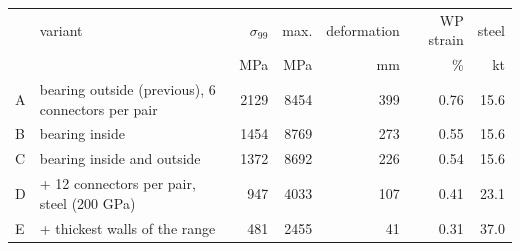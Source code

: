 \begin{tabular}{@{}llrrrrr@{}}\toprule
 & variant & $\sigma_{99}$ & max. & deformation & WP strain & steel \\
 & & MPa & MPa & mm & \% & kt \\\midrule
A & bearing outside (previous), 6 connectors per pair & \num{2129} & \num{8454} & \num{399} & \num{0.76} & \num{15.6} \\
B & bearing inside & \num{1454} & \num{8769} & \num{273} & \num{0.55} & \num{15.6} \\
C & bearing inside and outside & \num{1372} & \num{8692} & \num{226} & \num{0.54} & \num{15.6} \\
D & + 12 connectors per pair, steel (200 GPa) & \num{947} & \num{4033} & \num{107} & \num{0.41} & \num{23.1} \\
E & + thickest walls of the range & \num{481} & \num{2455} & \num{41} & \num{0.31} & \num{37.0} \\
\bottomrule\end{tabular}
